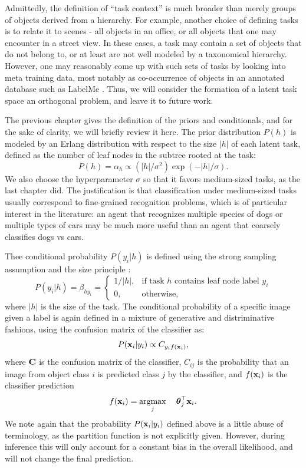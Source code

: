 Admittedly, the definition of ``task context'' is much broader than merely groups of objects derived from a hierarchy. For example, another choice of defining tasks is to relate it to scenes - all objects in an office, or all objects that one may encounter in a street view. In these cases, a task may contain a set of objects that do not belong to, or at least are not well modeled by a taxonomical hierarchy. However, one may reasonably come up with such sets of tasks by looking into meta training data, most notably as co-occurrence of objects in an annotated database such as LabelMe \cite{russell2008labelme}. Thus, we will consider the formation of a latent task space an orthogonal problem, and leave it to future work.

The previous chapter gives the definition of the priors and conditionals, and for the sake of clarity, we will briefly review it here. The prior distribution $P(h)$ is modeled by an Erlang distribution with respect to the size $|h|$ of each latent task, defined as the number of leaf nodes in the subtree rooted at the task:
\begin{equation}
    P(h) = \alpha_h \propto (|h|/\sigma^2) \exp(-|h|/\sigma).
\end{equation}
We also choose the hyperparameter $\sigma$ so that it favors medium-sized tasks, as the last chapter did. The justification is that classification under medium-sized tasks usually correspond to fine-grained recognition problems, which is of particular interest in the literature: an agent that recognizes multiple species of dogs or multiple types of cars may be much more useful than an agent that coarsely classifies dogs vs cars.

Thee conditional probability $P(y_i | h)$ is defined using the strong sampling assumption and the size principle \cite{tenenbaum2001generalization}:
\begin{equation}
    P(y_i | h) = \beta_{hy_i} = \left\{\begin{array}{ll}
            1/|h|, & \text{if task } h \text{ contains leaf node label } y_i\\
                0, & \text{otherwise},
        \end{array}\right.
\end{equation}
where $|h|$ is the size of the task. The conditional probability of a specific image given a label is again defined in a mixture of generative and distriminative fashions, using the confusion matrix of the classifier as:
\begin{equation}
    P(\mathbf{x}_i|y_i) \propto C_{y_if(\mathbf{x}_i)},
\end{equation}
where $\mathbf{C}$ is the confusion matrix of the classifier, $C_{ij}$ is the probability that an image from object class $i$ is predicted class $j$ by the classifier, and $f(\mathbf{x}_i)$ is the classifier prediction
\begin{equation}
    f(\mathbf{x}_i) = \underset{j}{\mathrm{argmax}} \:\quad \boldsymbol{\theta}_j^\top \mathbf{x}_i.
\end{equation}
We note again that the probability $P(\mathbf{x}_i|y_i)$ defined above is a little abuse of terminology, as the partition function is not explicitly given. However, during inference this will only account for a constant bias in the overall likelihood, and will not change the final prediction.

